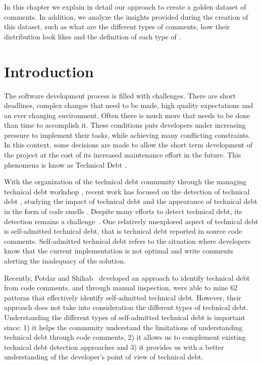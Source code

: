 In this chapter we explain in detail our approach to create a golden dataset of \SATD comments. In addition, we analyze the insights provided during the creation of this dataset, such as what are the different types of \SATD comments, how their distribution look likes and the definition of each type of \SATD. 

\section{Introduction}
\label{chap3:sec:introduction}

The software development process is filled with challenges. There are short deadlines, complex changes that need to be made, high quality expectations and an ever changing environment. Often there is much more that needs to be done than time to accomplish it. These conditions puts developers under increasing pressure to implement their tasks, while achieving many conflicting constraints. In this context, some decisions are made to allow the short term development of the project at the cost of its increased maintenance effort in the future. This phenomena is know as Technical Debt \cite{Cunningham1992WPM}. 

With the organization of the technical debt community through the managing technical debt workshop \cite{Falessi2014MTD}, recent work has focused on the detection of technical debt \cite{Potdar2014ICSME,Zazworka2013CSE}, studying the impact of technical debt \cite{Zazworka2011MTD}
and the appearance of technical debt in the form of code smells \cite{Fontana2012MTD}. Despite many efforts to detect technical debt, its detection remains a challenge~\cite{Potdar2014ICSME}. One relatively unexplored aspect of technical debt is self-admitted technical debt, that is technical debt reported in source code comments. Self-admitted technical debt refers to the situation where developers know that the current implementation is not optimal and write comments alerting the inadequacy of the solution. 

Recently, Potdar and Shihab~\cite{Potdar2014ICSME} developed an approach to identify technical debt from code comments, and through manual inspection, were able to mine 62 patterns that effectively identify self-admitted technical debt. However, their approach does not take into consideration the different types of technical debt. Understanding the different types of self-admitted technical debt is important since: 1) it helps the community understand the limitations of understanding technical debt through code comments, 2) it allows us to complement existing technical debt detection approaches and 3) it provides us with a better understanding of the developer's point of view of technical debt.

